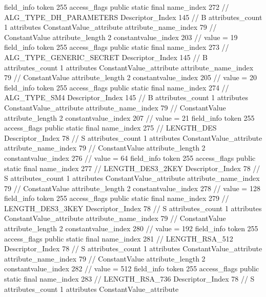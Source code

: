 {{{{{{{				}
				}
			}
			field_info {
				token	255
				access_flags	public static final
				name_index	272		// ALG_TYPE_DH_PARAMETERS
				Descriptor_Index	145		// B
				attributes_count	1
				attributes {
				ConstantValue_attribute {
					attribute_name_index	79		// ConstantValue
					attribute_length	2
					constantvalue_index	203		// value = 19
				}
				}
			}
			field_info {
				token	255
				access_flags	public static final
				name_index	273		// ALG_TYPE_GENERIC_SECRET
				Descriptor_Index	145		// B
				attributes_count	1
				attributes {
				ConstantValue_attribute {
					attribute_name_index	79		// ConstantValue
					attribute_length	2
					constantvalue_index	205		// value = 20
				}
				}
			}
			field_info {
				token	255
				access_flags	public static final
				name_index	274		// ALG_TYPE_SM4
				Descriptor_Index	145		// B
				attributes_count	1
				attributes {
				ConstantValue_attribute {
					attribute_name_index	79		// ConstantValue
					attribute_length	2
					constantvalue_index	207		// value = 21
				}
				}
			}
			field_info {
				token	255
				access_flags	public static final
				name_index	275		// LENGTH_DES
				Descriptor_Index	78		// S
				attributes_count	1
				attributes {
				ConstantValue_attribute {
					attribute_name_index	79		// ConstantValue
					attribute_length	2
					constantvalue_index	276		// value = 64
				}
				}
			}
			field_info {
				token	255
				access_flags	public static final
				name_index	277		// LENGTH_DES3_2KEY
				Descriptor_Index	78		// S
				attributes_count	1
				attributes {
				ConstantValue_attribute {
					attribute_name_index	79		// ConstantValue
					attribute_length	2
					constantvalue_index	278		// value = 128
				}
				}
			}
			field_info {
				token	255
				access_flags	public static final
				name_index	279		// LENGTH_DES3_3KEY
				Descriptor_Index	78		// S
				attributes_count	1
				attributes {
				ConstantValue_attribute {
					attribute_name_index	79		// ConstantValue
					attribute_length	2
					constantvalue_index	280		// value = 192
				}
				}
			}
			field_info {
				token	255
				access_flags	public static final
				name_index	281		// LENGTH_RSA_512
				Descriptor_Index	78		// S
				attributes_count	1
				attributes {
				ConstantValue_attribute {
					attribute_name_index	79		// ConstantValue
					attribute_length	2
					constantvalue_index	282		// value = 512
				}
				}
			}
			field_info {
				token	255
				access_flags	public static final
				name_index	283		// LENGTH_RSA_736
				Descriptor_Index	78		// S
				attributes_count	1
				attributes {
				ConstantValue_attribute {
}}}}}}}
